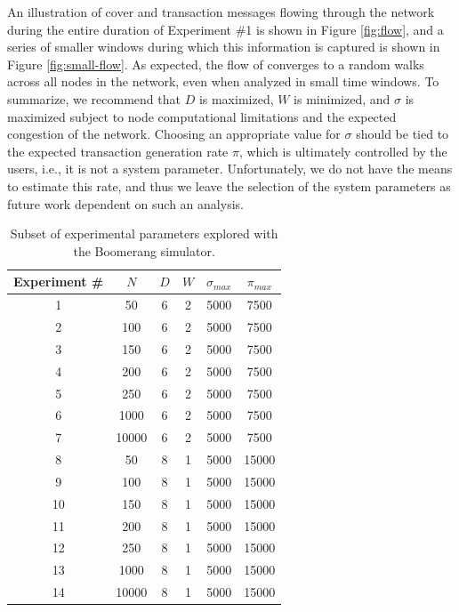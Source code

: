 An illustration of cover and transaction messages flowing through the network during the entire duration of Experiment \#1 is shown in Figure \ref{fig:flow}, and a series of smaller windows during which this information is captured is shown in Figure \ref{fig:small-flow}. As expected, the flow of converges to a random walks across all nodes in the network, even when analyzed in small time windows. To summarize, we recommend that $D$ is maximized, $W$ is minimized, and $\sigma$ is maximized subject to node computational limitations and the expected congestion of the network. Choosing an appropriate value for $\sigma$ should be tied to the expected transaction generation rate $\pi$, which is ultimately controlled by the users, i.e., it is not a system parameter. Unfortunately, we do not have the means to estimate this rate, and thus we leave the selection of the system parameters as future work dependent on such an analysis. 

\begin{table}
\begin{center}
\caption{Subset of experimental parameters explored with the Boomerang simulator.}
\label{tab:experiments}
    \begin{tabular}{|c|c|c|c|c|c|} \hline
    {\bf Experiment \#} & $N$ & $D$ & $W$ & $\sigma_{max}$ & $\pi_{max}$ \\ \hline
    1 & 50     & 6 & 2 & 5000 & 7500 \\ 
    2 & 100    & 6 & 2 & 5000 & 7500 \\ 
    3 & 150    & 6 & 2 & 5000 & 7500 \\ 
    4 & 200    & 6 & 2 & 5000 & 7500 \\ 
    5 & 250    & 6 & 2 & 5000 & 7500 \\ 
    6 & 1000   & 6 & 2 & 5000 & 7500 \\ 
    7 & 10000  & 6 & 2 & 5000 & 7500 \\ 
    8 & 50     & 8 & 1 & 5000 & 15000 \\ 
    9 & 100    & 8 & 1 & 5000 & 15000 \\ 
    10 & 150   & 8 & 1 & 5000 & 15000 \\ 
    11 & 200   & 8 & 1 & 5000 & 15000 \\ 
    12 & 250   & 8 & 1 & 5000 & 15000 \\ 
    13 & 1000  & 8 & 1 & 5000 & 15000 \\ 
    14 & 10000 & 8 & 1 & 5000 & 15000 \\ 
    \hline
    \end{tabular}
\end{center}
\end{table}

